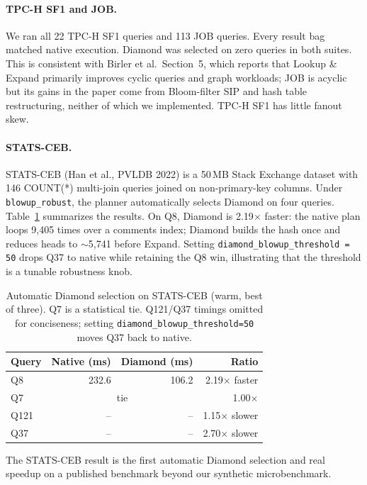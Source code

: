 \documentclass[10pt,twocolumn]{article}
\newcommand{\code}[1]{{\small\texttt{#1}}}
\begin{document}
\paragraph{TPC-H SF1 and JOB.}
We ran all 22 TPC-H SF1 queries and 113 JOB queries. Every result bag matched
native execution. Diamond was selected on zero queries in both suites.
This is consistent with Birler et al.\ Section~5, which reports that
Lookup \& Expand primarily improves cyclic queries and graph workloads; JOB
is acyclic but its gains in the paper come from Bloom-filter SIP and hash
table restructuring, neither of which we implemented. TPC-H SF1 has little
fanout skew.

\paragraph{STATS-CEB.}
STATS-CEB (Han et al., PVLDB 2022) is a 50\,MB Stack Exchange dataset with
146 COUNT(*) multi-join queries joined on non-primary-key columns. Under
\code{blowup\_robust}, the planner automatically selects Diamond on four
queries. Table~\ref{tab:stats} summarizes the results. On Q8, Diamond is
2.19$\times$ faster: the native plan loops 9,405 times over a comments index;
Diamond builds the hash once and reduces heads to $\sim$5,741 before Expand.
Setting \code{diamond\_blowup\_threshold = 50} drops Q37 to native while
retaining the Q8 win, illustrating that the threshold is a tunable robustness
knob.

\begin{table}[ht]
\centering\small
\setlength{\tabcolsep}{4pt}
\begin{tabular}{lrrr}\toprule
Query & Native (ms) & Diamond (ms) & Ratio\\\midrule
Q8  & 232.6 & 106.2 & 2.19$\times$ faster\\
Q7  & \multicolumn{2}{c}{tie} & 1.00$\times$\\
Q121 & -- & -- & 1.15$\times$ slower\\
Q37 & -- & -- & 2.70$\times$ slower\\\bottomrule
\end{tabular}
\caption{Automatic Diamond selection on STATS-CEB (warm, best of three).
Q7 is a statistical tie. Q121/Q37 timings omitted for conciseness;
setting \code{diamond\_blowup\_threshold=50} moves Q37 back to native.}
\label{tab:stats}
\end{table}

The STATS-CEB result is the first automatic Diamond selection and real speedup
on a published benchmark beyond our synthetic microbenchmark.
\end{document}
